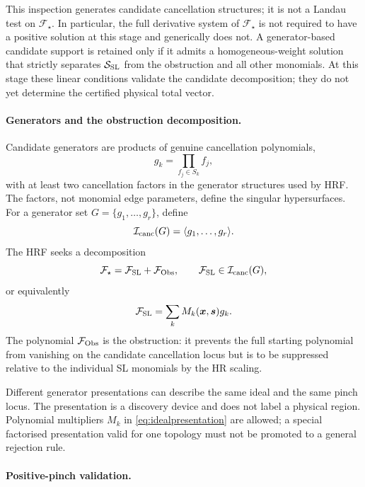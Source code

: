 \documentclass[a4paper,11pt]{article}
\newcommand{\x}{\boldsymbol{x}}
\newcommand{\s}{\boldsymbol{s}}
\newcommand{\FSL}{\mathcal F_{\rm SL}}
\newcommand{\SSL}{\mathcal S_{\rm SL}}
\newcommand{\FObs}{\mathcal F_{\rm Obs}}
\begin{document}
This inspection generates candidate cancellation structures; it is not a
Landau test on \(\mathcal F_\star\).  In particular, the full derivative
system of \(\mathcal F_\star\) is not required to have a positive solution at
this stage and generically does not.  A generator-based candidate support is
retained only if it admits a homogeneous-weight solution that strictly
separates \(\SSL\) from the obstruction and all other monomials.  At this
stage these linear conditions validate the candidate decomposition; they do
not yet determine the certified physical total vector.

\paragraph{Generators and the obstruction decomposition.}

Candidate generators are products of genuine cancellation polynomials,
\begin{equation}
 g_k=\prod_{f_j\in S_k}f_j,
\end{equation}
with at least two cancellation factors in the generator structures used by
HRF.  The factors, not monomial edge parameters, define the singular
hypersurfaces.  For a generator set \(G=\{g_1,\ldots,g_r\}\), define
\begin{equation}
 \mathcal I_{\rm canc}(G)
 =
 \langle g_1,\ldots,g_r\rangle.
\end{equation}
The HRF seeks a decomposition
\begin{equation}
 \mathcal F_\star=\FSL+\FObs,
 \qquad
 \FSL\in\mathcal I_{\rm canc}(G),
\label{eq:obstruction}
\end{equation}
or equivalently
\begin{equation}
 \FSL=\sum_kM_k(\x,\s)g_k.
\label{eq:idealpresentation}
\end{equation}
The polynomial \(\FObs\) is the obstruction: it prevents the full starting
polynomial from vanishing on the candidate cancellation locus but is to be
suppressed relative to the individual SL monomials by the HR scaling.

Different generator presentations can describe the same ideal and the same
pinch locus.  The presentation is a discovery device and does not label a
physical region.  Polynomial multipliers \(M_k\) in
\eqref{eq:idealpresentation} are allowed; a special factorised presentation
valid for one topology must not be promoted to a general rejection rule.

\paragraph{Positive-pinch validation.}
\end{document}
